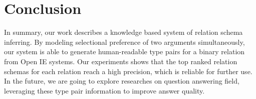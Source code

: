 \section{Conclusion}

In summary, our work describes a knowledge based system of relation schema inferring.
By modeling selectional preference of two arguments simultaneously,
our system is able to generate human-readable type pairs for a binary relation from Open IE systems. 
Our experiments shows that the top ranked relation schemas for each relation reach a high precision,
which is reliable for further use.
In the future, we are going to explore researches on question answering field, leveraging these
type pair information to improve answer quality.